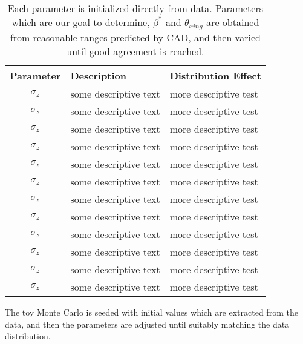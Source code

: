 \begin{table}
\centering
\begin{tabular}{c p{8cm} p{8cm} }
\toprule
\textbf{Parameter} & \textbf{Description} & \textbf{Distribution Effect}  \\
\midrule 
$\sigma_{z}$ & some descriptive text  & more descriptive test  \\
$\sigma_{z}$ & some descriptive text  & more descriptive test  \\
$\sigma_{z}$ & some descriptive text  & more descriptive test  \\
$\sigma_{z}$ & some descriptive text  & more descriptive test  \\
$\sigma_{z}$ & some descriptive text  & more descriptive test  \\
$\sigma_{z}$ & some descriptive text  & more descriptive test  \\
$\sigma_{z}$ & some descriptive text  & more descriptive test  \\
$\sigma_{z}$ & some descriptive text  & more descriptive test  \\
$\sigma_{z}$ & some descriptive text  & more descriptive test  \\
$\sigma_{z}$ & some descriptive text  & more descriptive test  \\
$\sigma_{z}$ & some descriptive text  & more descriptive test  \\
$\sigma_{z}$ & some descriptive text  & more descriptive test  \\
\bottomrule
\end{tabular}
\caption{
Each parameter is initialized directly from data. Parameters which are our goal
to determine, $\beta^{*}$ and $\theta_{xing}$ are obtained from reasonable
ranges predicted by CAD, and then varied until good agreement is reached.
}
\label{tab:simulationparameters}
\end{table}

The toy Monte Carlo is seeded with initial values which are extracted from the
data, and then the parameters are adjusted until suitably matching the data
distribution.


